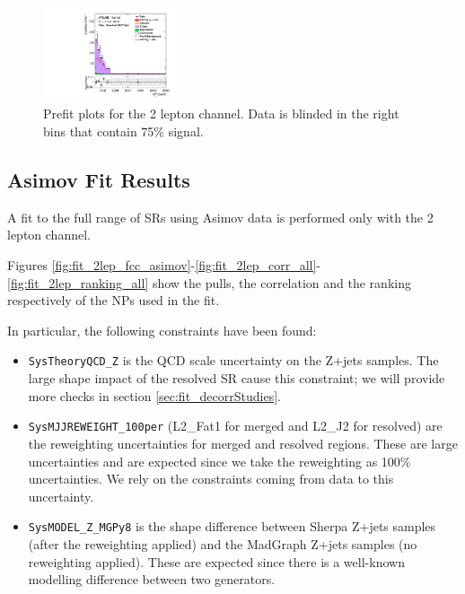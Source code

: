 \begin{figure}[ht]
    \includegraphics[width=0.35\textwidth]{figures/2lep/FitResults/Region_distMTagResJets_DCRVjetFid_BMin0_T0_Y6051_incTag1_J2_L2_incJet1_GlobalFit_unconditionnal_mu1.pdf}
    \caption{Prefit plots for the 2 lepton channel. Data is blinded in the right bins that contain 75\% signal.}
       \label{fig:fit_2lep_prefit}
\end{figure}
\clearpage

\subsection{Asimov Fit Results}
A fit to the full range of SRs using Asimov data is performed only with the 2 lepton channel.

Figures \ref{fig:fit_2lep_fcc_asimov}-\ref{fig:fit_2lep_corr_all}-\ref{fig:fit_2lep_ranking_all}
show the pulls, the correlation and the ranking respectively of the NPs used in the fit.

In particular, the following constraints have been found:
\begin{itemize}
       \item \texttt{SysTheoryQCD\_Z} is the QCD scale uncertainty on the Z+jets samples.
       The large shape impact of the resolved SR cause this constraint;
       we will provide more checks in section \ref{sec:fit_decorrStudies}.

       \item \texttt{SysMJJREWEIGHT\_100per} (L2\_Fat1 for merged and L2\_J2 for resolved)
       are the \mjjtag reweighting uncertainties for merged and resolved regions.
       These are large uncertainties and are expected since we take the \mjjtag reweighting as 100\% uncertainties.
       We rely on the constraints coming from data to this uncertainty.

       \item \texttt{SysMODEL\_Z\_MGPy8}
       is the shape difference between Sherpa Z+jets samples (after the \mjjtag reweighting applied)
       and the MadGraph Z+jets samples (no \mjjtag reweighting applied).
       These are expected since there is a well-known modelling difference between two generators.

\end{itemize}

